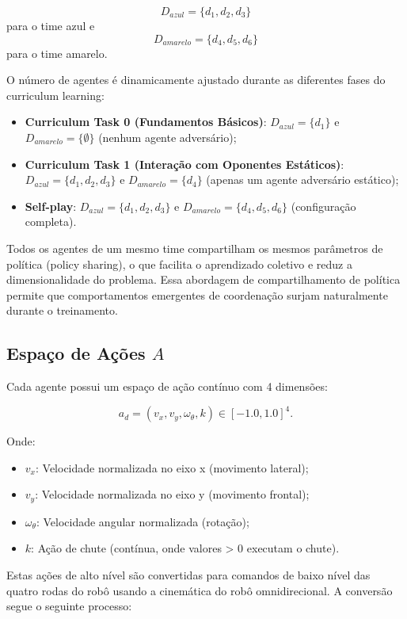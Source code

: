 $$D_{azul} = \{d_1, d_2, d_3\}$$ para o time azul e $$D_{amarelo} = \{d_4, d_5, d_6\}$$ para o time amarelo.

O número de agentes é dinamicamente ajustado durante as diferentes fases do curriculum learning:

\begin{itemize}
    \item \textbf{Curriculum Task 0 (Fundamentos Básicos)}: $D_{azul} = \{d_1\}$ e $D_{amarelo} = \{\emptyset\}$ (nenhum agente adversário);
    \item \textbf{Curriculum Task 1 (Interação com Oponentes Estáticos)}: $D_{azul} = \{d_1, d_2, d_3\}$ e $D_{amarelo} = \{d_4\}$ (apenas um agente adversário estático);
    \item \textbf{Self-play}: $D_{azul} = \{d_1, d_2, d_3\}$ e $D_{amarelo} = \{d_4, d_5, d_6\}$ (configuração completa).
\end{itemize}

Todos os agentes de um mesmo time compartilham os mesmos parâmetros de política (policy sharing), o que facilita o aprendizado coletivo e reduz a dimensionalidade do problema. Essa abordagem de compartilhamento de política permite que comportamentos emergentes de coordenação surjam naturalmente durante o treinamento.

\subsection{Espaço de Ações $A$}

Cada agente possui um espaço de ação contínuo com 4 dimensões:

$$a_d = (v_x, v_y, \omega_{\theta}, k) \in [-1.0, 1.0]^4.$$

Onde:
\begin{itemize}
    \item $v_x$: Velocidade normalizada no eixo x (movimento lateral);
    \item $v_y$: Velocidade normalizada no eixo y (movimento frontal);
    \item $\omega_{\theta}$: Velocidade angular normalizada (rotação);
    \item $k$: Ação de chute (contínua, onde valores > 0 executam o chute).
\end{itemize}

Estas ações de alto nível são convertidas para comandos de baixo nível das quatro rodas do robô usando a cinemática do robô omnidirecional. A conversão segue o seguinte processo:

